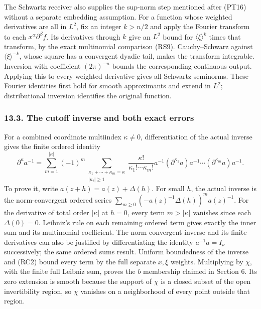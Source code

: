 \documentclass[
  11pt,
]{article}
\begin{document}
The Schwartz receiver also supplies the sup-norm step mentioned after
(PT16) without a separate embedding assumption. For a function whose
weighted derivatives are all in \(L^2\), fix an integer \(k>n/2\) and
apply the Fourier transform to each \(x^\alpha\partial^\beta f\). Its
derivatives through \(k\) give an \(L^2\) bound for
\(\langle\xi\rangle^k\) times that transform, by the exact multinomial
comparison (RS9). Cauchy--Schwarz against \(\langle\xi\rangle^{-k}\),
whose square has a convergent dyadic tail, makes the transform
integrable. Inversion with coefficient \((2\pi)^{-n}\) bounds the
corresponding continuous output. Applying this to every weighted
derivative gives all Schwartz seminorms. These Fourier identities first
hold for smooth approximants and extend in \(L^2\); distributional
inversion identifies the original function.

\subsubsection{13.3. The cutoff inverse and both exact
errors}\label{the-cutoff-inverse-and-both-exact-errors}

For a combined coordinate multiindex \(\kappa\ne0\), differentiation of
the actual inverse gives the finite ordered identity \[
 \partial^\kappa a^{-1}
 =\sum_{m=1}^{|\kappa|}(-1)^m
   \sum_{\substack{\kappa_1+\cdots+\kappa_m=\kappa\\
                   |\kappa_i|\geq1}}
       \frac{\kappa!}{\kappa_1!\cdots\kappa_m!}
       a^{-1}(\partial^{\kappa_1}a)a^{-1}
            \cdots(\partial^{\kappa_m}a)a^{-1}.
 \tag{RS12}
\] To prove it, write \(a(z+h)=a(z)+\Delta(h)\). For small \(h\), the
actual inverse is the norm-convergent ordered series
\(\sum_{m\geq0}(-a(z)^{-1}\Delta(h))^m a(z)^{-1}\). For the derivative
of total order \(|\kappa|\) at \(h=0\), every term \(m>|\kappa|\)
vanishes since each \(\Delta(0)=0\). Leibniz's rule on each remaining
ordered term gives exactly the inner sum and its multinomial
coefficient. The norm-convergent inverse and its finite derivatives can
also be justified by differentiating the identity \(a^{-1}a=I_\nu\)
successively; the same ordered sums result. Uniform boundedness of the
inverse and (RC2) bound every term by the full separate \(x,\xi\)
weights. Multiplying by \(\chi\), with the finite full Leibniz sum,
proves the \(b\) membership claimed in Section 6. Its zero extension is
smooth because the support of \(\chi\) is a closed subset of the open
invertibility region, so \(\chi\) vanishes on a neighborhood of every
point outside that region.
\end{document}
